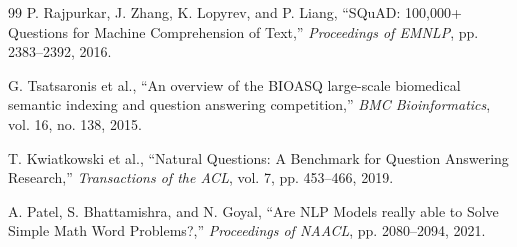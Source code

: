 \documentclass[oneside,ko,under]{snuthesis}
\begin{document}
\begin{thebibliography}{99}
P. Rajpurkar, J. Zhang, K. Lopyrev, and P. Liang,
``SQuAD: 100{,}000+ Questions for Machine Comprehension of Text,''
\textit{Proceedings of EMNLP}, pp. 2383--2392, 2016.

G. Tsatsaronis et al.,
``An overview of the BIOASQ large-scale biomedical semantic indexing and question answering competition,''
\textit{BMC Bioinformatics}, vol. 16, no. 138, 2015.

T. Kwiatkowski et al.,
``Natural Questions: A Benchmark for Question Answering Research,''
\textit{Transactions of the ACL}, vol. 7, pp. 453--466, 2019.

A. Patel, S. Bhattamishra, and N. Goyal,
``Are NLP Models really able to Solve Simple Math Word Problems?,''
\textit{Proceedings of NAACL}, pp. 2080--2094, 2021.

\end{thebibliography}
\end{document}
